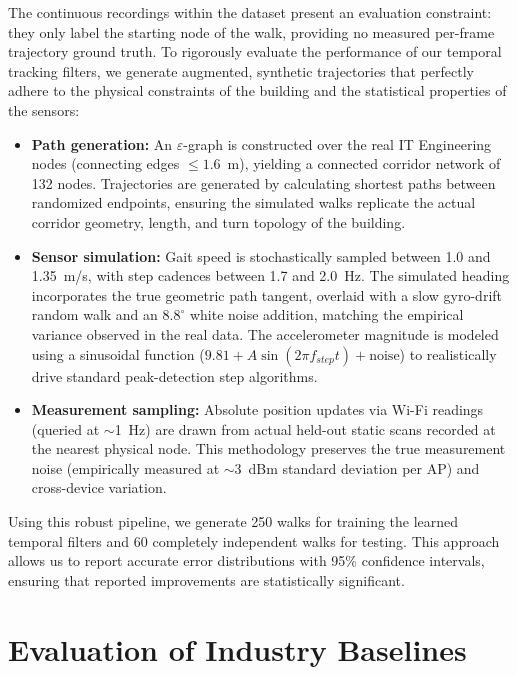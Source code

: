 \documentclass[conference]{IEEEtran}
\begin{document}
The continuous recordings within the dataset present an evaluation constraint: they only label the starting node of the walk, providing no measured per-frame trajectory ground truth. To rigorously evaluate the performance of our temporal tracking filters, we generate augmented, synthetic trajectories that perfectly adhere to the physical constraints of the building and the statistical properties of the sensors:

\begin{itemize}
    \item \textbf{Path generation:} An $\varepsilon$-graph is constructed over the real IT Engineering nodes (connecting edges $\leq 1.6$~m), yielding a connected corridor network of 132 nodes. Trajectories are generated by calculating shortest paths between randomized endpoints, ensuring the simulated walks replicate the actual corridor geometry, length, and turn topology of the building.
    \item \textbf{Sensor simulation:} Gait speed is stochastically sampled between 1.0 and 1.35~m/s, with step cadences between 1.7 and 2.0~Hz. The simulated heading incorporates the true geometric path tangent, overlaid with a slow gyro-drift random walk and an $8.8^{\circ}$ white noise addition, matching the empirical variance observed in the real data. The accelerometer magnitude is modeled using a sinusoidal function ($9.81 + A\sin(2\pi f_{step} t) + \text{noise}$) to realistically drive standard peak-detection step algorithms.
    \item \textbf{Measurement sampling:} Absolute position updates via Wi-Fi readings (queried at $\sim$1~Hz) are drawn from actual held-out static scans recorded at the nearest physical node. This methodology preserves the true measurement noise (empirically measured at $\sim$3~dBm standard deviation per AP) and cross-device variation.
\end{itemize}

Using this robust pipeline, we generate 250 walks for training the learned temporal filters and 60 completely independent walks for testing. This approach allows us to report accurate error distributions with 95\% confidence intervals, ensuring that reported improvements are statistically significant.

\section{Evaluation of Industry Baselines}\label{sec:baselines}
\end{document}
